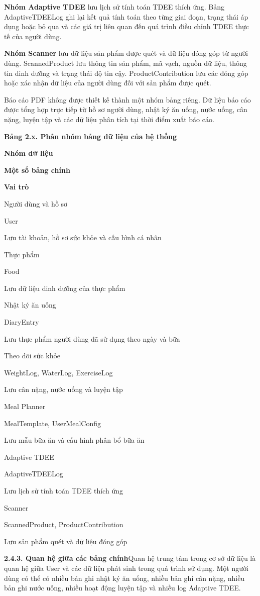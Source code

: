 \textbf{Nhóm Adaptive TDEE} lưu lịch sử tính toán TDEE thích ứng. Bảng AdaptiveTDEELog ghi lại kết quả tính toán theo từng giai đoạn, trạng thái áp dụng hoặc bỏ qua và các giá trị liên quan đến quá trình điều chỉnh TDEE thực tế của người dùng.

\textbf{Nhóm Scanner} lưu dữ liệu sản phẩm được quét và dữ liệu đóng góp từ người dùng. ScannedProduct lưu thông tin sản phẩm, mã vạch, nguồn dữ liệu, thông tin dinh dưỡng và trạng thái độ tin cậy. ProductContribution lưu các đóng góp hoặc xác nhận dữ liệu của người dùng đối với sản phẩm được quét.

Báo cáo PDF không được thiết kế thành một nhóm bảng riêng. Dữ liệu báo cáo được tổng hợp trực tiếp từ hồ sơ người dùng, nhật ký ăn uống, nước uống, cân nặng, luyện tập và các dữ liệu phân tích tại thời điểm xuất báo cáo.

\textbf{Bảng 2.x. Phân nhóm bảng dữ liệu của hệ thống}

\textbf{Nhóm dữ liệu}

\textbf{Một số bảng chính}

\textbf{Vai trò}

Người dùng và hồ sơ

User

Lưu tài khoản, hồ sơ sức khỏe và cấu hình cá nhân

Thực phẩm

Food

Lưu dữ liệu dinh dưỡng của thực phẩm

Nhật ký ăn uống

DiaryEntry

Lưu thực phẩm người dùng đã sử dụng theo ngày và bữa

Theo dõi sức khỏe

WeightLog, WaterLog, ExerciseLog

Lưu cân nặng, nước uống và luyện tập

Meal Planner

MealTemplate, UserMealConfig

Lưu mẫu bữa ăn và cấu hình phân bổ bữa ăn

Adaptive TDEE

AdaptiveTDEELog

Lưu lịch sử tính toán TDEE thích ứng

Scanner

ScannedProduct, ProductContribution

Lưu sản phẩm quét và dữ liệu đóng góp

\textbf{2.4.3. Quan hệ giữa các bảng chính}Quan hệ trung tâm trong cơ sở dữ liệu là quan hệ giữa User và các dữ liệu phát sinh trong quá trình sử dụng. Một người dùng có thể có nhiều bản ghi nhật ký ăn uống, nhiều bản ghi cân nặng, nhiều bản ghi nước uống, nhiều hoạt động luyện tập và nhiều log Adaptive TDEE.

